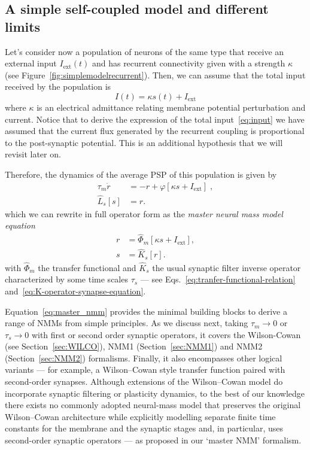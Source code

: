 \documentclass[12pt]{article}
\numberwithin{equation}{section}
\begin{document}
\subsection{A simple self-coupled model and different limits} 
Let's consider now a population of neurons of the same type that receive an external input $I_\text{ext}(t)$
and has recurrent connectivity given with a strength $\kappa$ (see Figure~\ref{fig:simplemodelrecurrent}). 
Then, we can assume that the total input received by the population is
\begin{equation}\label{eq:input}
I(t) = \kappa s(t) + I_\text{ext}
\end{equation}
where $\kappa$ is an electrical admittance relating membrane potential perturbation and current.
Notice that to derive the expression of the total input~\eqref{eq:input} we have assumed
that the current flux generated by the recurrent coupling is proportional to the post-synaptic potential.
This is an additional hypothesis that we will revisit later on.

Therefore, the dynamics of the average PSP of this population is given by
\begin{equation}\label{eq:simpleNMM}
\begin{aligned}
 \tau_m \dot r &= -r + \varphi[\kappa s +  I_\text{ext}] \;,\\
 \hat L_s[s] &= r.
 \end{aligned}
\end{equation}
which we can rewrite in full operator form as the\textit{ master neural mass model equation}
\begin{equation}\label{eq:master_nmm}
 \boxed{\begin{aligned}
 r &=  \hat \Phi_m [\kappa s +  I_\text{ext}] ,\\
 s &= \hat K_s [r].
 \end{aligned}}
\end{equation}
with $\hat \Phi_m$ the transfer functional and  $\hat K_s$ the usual synaptic filter inverse operator characterized by some time scales $\tau_s$ --- see Eqs.~\eqref{eq:tranfer-functional-relation} and~\eqref{eq:K-operator-synapse-equation}.

Equation~\ref{eq:master_nmm} provides the minimal building blocks to derive a range
of NMMs from simple principles.  As we discuss next, taking
$\tau_m\to 0$ or $\tau_s\to 0$ with first or second order synaptic operators, it covers the Wilson-Cowan (see Section~\ref{sec:WILCO}), NMM1 (Section~\ref{sec:NMM1}) and NMM2 (Section~\ref{sec:NMM2}) formalisms.   
Finally, it also encompasses other logical variants — for example, a Wilson–Cowan style transfer function paired with second-order synapses. Although extensions of the Wilson–Cowan model do incorporate synaptic filtering or plasticity dynamics, to the best of our knowledge there exists no commonly adopted neural-mass model that preserves the original Wilson–Cowan architecture while explicitly modelling separate finite time constants for the membrane and the synaptic stages and, in particular, uses second-order synaptic operators — as proposed in our ‘master NMM’ formalism.
\end{document}
